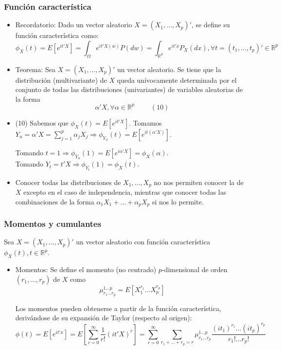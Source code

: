 \documentclass[11pt,a4paper]{article}
\begin{document}
\subsubsection{Función característica}
\begin{itemize}
\item Recordatorio: Dado un vector aleatorio $X = (X_{1}, \dots, X_{p})'$, se define su función característica como:
$$\phi_{X}(t) = E[e^{it'X}] = \int_{\Omega} e^{it'X(w)} P(dw) = \int_{\mathbb{R}^{d}} e^{it'x}P_{X}(dx), \forall t = (t_{1}, \dots, t_{p})' \in \mathbb{R}^{p}$$

\item Teorema: Sea $X = (X_{1}, \dots, X_{p})'$ un vector aleatorio. Se tiene que la distribución (multivariante) de $X$ queda unívocamente determinada por el conjunto de todas las distribuciones (univariantes) de variables aleatorias de la forma
$$\alpha' X, \forall \alpha \in \mathbb{R}^{p} \hspace{1cm} (10)$$

\item (10) Sabemos que $\phi_{X}(t) = E[e^{it'X}]$. Tomamos $Y_{n} = \alpha'X = \sum_{j=1}^{p} \alpha_{j}X_{j} \Rightarrow \phi_{Y_{\alpha}}(t) = E[e^{it(\alpha'X)}]$.

Tomando $t = 1 \Rightarrow \phi_{Y_{\alpha}} (1) = E[e^{i\alpha'X}] = \phi_{X}(\alpha)$. \\
Tomando $Y_{t} = t'X \Rightarrow \phi_{Y_{t}}(1) = \phi_{X}(t)$.

\item Conocer todas las distribuciones de $X_{1}, \dots, X_{p}$ no nos permiten conocer la de $X$ excepto en el caso de independencia, mientras que conocer todas las combinaciones de la forma $\alpha_{1}X_{1} + \dots + \alpha_{p}X_{p}$ si nos lo permite.
\end{itemize}

\subsubsection{Momentos y cumulantes}

Sea $X = (X_{1}, \dots, X_{p})'$ un vector aleatorio con función característica $\phi_{X}(t), t \in \mathbb{R}^{p}$.
\begin{itemize}
\item Momentos: Se define el momento (no centrado) $p$-dimensional de orden $(r_{1}, \dots, r_{p})$ de $X$ como
$$\mu_{r_{1} \dots r_{p}}^{1 \dots p} = E[X_{1}^{r_{1}} \dots X_{p}^{r_{p}}]$$

Los momentos pueden obtenerse a partir de la función característica, derivándose de su expansión de Taylor (respecto al origen):
$$\phi(t) = E[e^{it'x}] = E[\sum_{r=0}^{\infty} \frac{1}{r!} (it'X)^{r}] = \sum_{r=0}^{\infty} \sum_{r_{1} + \dots + r_{p} = r} \mu_{r_{1} \dots r_{p}}^{1 \dots p} \frac{(it_{1})^{r_{1}} \dots (it_{p})^{r_{p}}}{r_{1}! \dots r_{p}!}$$
\end{itemize}
\end{document}
